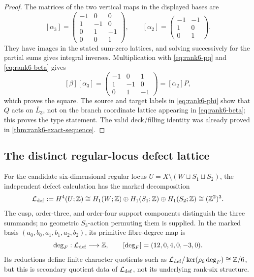 \documentclass[11pt]{article}
\theoremstyle{definition}
\theoremstyle{remark}
\numberwithin{equation}{section}
\begin{document}
\begin{proof}
The matrices of the two vertical maps in the displayed bases are
\[
 [\alpha_3]=
 \begin{pmatrix}-1&0&0\\1&-1&0\\0&1&-1\\0&0&1\end{pmatrix},
 \qquad
 [\alpha_2]=
 \begin{pmatrix}-1&-1\\1&0\\0&1\end{pmatrix}.
\]
They have images in the stated sum-zero lattices, and solving successively
for the partial sums gives integral inverses.  Multiplication with
\eqref{eq:rank6-pq} and \eqref{eq:rank6-beta} gives
\[
 [\beta][\alpha_3]
 =\begin{pmatrix}-1&0&1\\1&-1&0\\0&1&-1\end{pmatrix}
 =[\alpha_2]P,
\]
which proves the square.  The source and target labels in
\eqref{eq:rank6-phi} show that \(Q\) acts on \(\bar L_3\), not on the branch
coordinate lattice appearing in \eqref{eq:rank6-beta}; this proves the type
statement.  The valid deck/filling identity was already proved in
\cref{thm:rank6-exact-sequence}.
\end{proof}

\subsection{The distinct regular-locus defect lattice}
\label{subsec:distinct-defect-lattice}

For the candidate six-dimensional regular locus
\(U=X\setminus(W\sqcup S_1\sqcup S_2)\), the independent defect calculation
has the marked decomposition
\begin{equation}
 \mathcal L_{\rm def}:=H^4(U;\mathbb Z)
 \cong H_1(W;\mathbb Z)\oplus H_1(S_1;\mathbb Z)
               \oplus H_1(S_2;\mathbb Z)
 \cong(\mathbb Z^2)^3.                                  \label{eq:rank6-defect-lattice}
\end{equation}
The cusp, order-three, and order-four support components distinguish the
three summands; no geometric \(S_3\)-action permuting them is supplied.  In
the marked basis \((a_0,b_0,a_1,b_1,a_2,b_2)\), its primitive fibre-degree
map is
\begin{equation}
 \deg_F:\mathcal L_{\rm def}\longrightarrow\mathbb Z,
 \qquad [\deg_F]=(12,0,4,0,-3,0).                       \label{eq:rank6-defect-degree}
\end{equation}
Its reductions define finite character quotients such as
\(\mathcal L_{\rm def}/\ker(\rho_6\deg_F)\cong\mathbb Z/6\), but this is
secondary quotient data of \(\mathcal L_{\rm def}\), not its underlying
rank-six structure.
\end{document}
